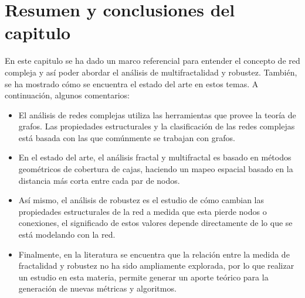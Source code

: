 \section{Resumen y conclusiones del capitulo}

En este capitulo se ha dado un marco referencial para entender el concepto de red compleja y así poder abordar el análisis de multifractalidad y robustez. También, se ha mostrado cómo se encuentra el estado del arte en estos temas. A continuación, algunos comentarios:

\begin{itemize}
    \item El análisis de redes complejas utiliza las herramientas que provee la teoría de grafos. Las propiedades estructurales y la clasificación de las redes complejas está basada con las que comúnmente se trabajan con grafos.
    \item En el estado del arte, el análisis fractal y multifractal es basado en métodos geométricos de cobertura de cajas, haciendo un mapeo espacial basado en la distancia más corta entre cada par de nodos.
    \item Así mismo, el análisis de robustez es el estudio de cómo cambian las propiedades estructurales de la red a medida que esta pierde nodos o conexiones, el significado de estos valores depende directamente de lo que se está modelando con la red.
    \item Finalmente, en la literatura se encuentra que la relación entre la medida de fractalidad y robustez no ha sido ampliamente explorada, por lo que realizar un estudio en esta materia, permite generar un aporte teórico para la generación de nuevas métricas y algoritmos.
\end{itemize}